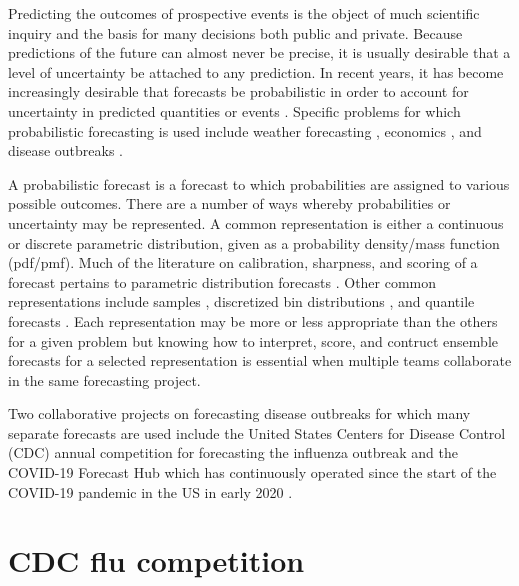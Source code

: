 \documentclass[11pt,notitlepage]{isuthesis}
\begin{document}
Predicting the outcomes of prospective events is the object of much scientific
inquiry and the basis for many decisions both public and private. Because 
predictions of the future can almost never be precise, it is usually desirable
that a level of uncertainty be attached to any prediction. In recent years, it
has become increasingly desirable that forecasts be probabilistic in order to 
account for uncertainty in predicted quantities or events 
\cite{gneiting2014probabilistic}. Specific problems for 
which probabilistic forecasting is used include weather forecasting
\cite{baran2018combining}, economics \cite{groen2013real}, and disease outbreaks
\cite{yamana2016superensemble}.

A probabilistic forecast is a forecast to which probabilities are assigned to 
various possible outcomes. There are a number of ways whereby probabilities or 
uncertainty may be represented. A common representation is either a continuous 
or
discrete parametric distribution, given as a probability density/mass function 
(pdf/pmf). Much of the literature 
on calibration, sharpness, and scoring of a forecast pertains to parametric 
distribution forecasts
\cite{gneiting2007probabilistic,gneiting2013combining,baran2018combining}.
Other common representations include samples \cite{krueger2016probabilistic}, 
discretized bin distributions \cite{mcgowan2019collaborative},
and quantile forecasts \cite{taylor2021evaluating, bracher2021evaluating}. 
Each representation may be more or less 
appropriate than the others for a given problem but knowing how to interpret, 
score, and contruct ensemble forecasts for a selected representation is 
essential when multiple teams collaborate in the same forecasting project.


Two collaborative projects on forecasting disease outbreaks for which many 
separate forecasts 
are used include the United States Centers for Disease Control (CDC)
annual competition for forecasting the influenza outbreak \cite{cdcflusight}
and the COVID-19 Forecast Hub which has 
continuously operated since the start of the COVID-19 pandemic in the US in 
early 2020 \cite{Cramer2021-hub-dataset}.

\section{CDC flu competition}
\end{document}
